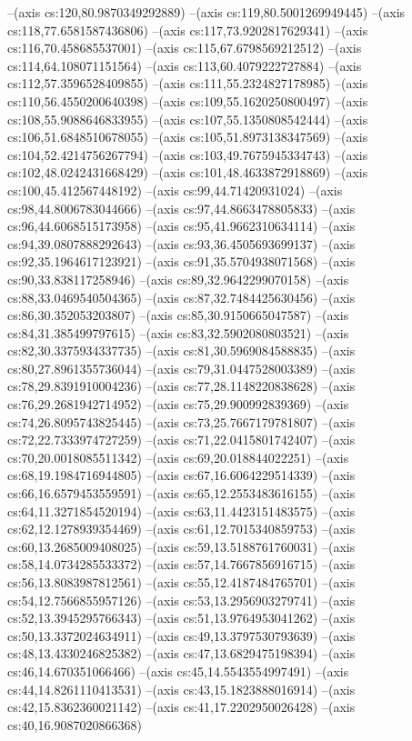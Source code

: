 --(axis cs:120,80.9870349292889)
--(axis cs:119,80.5001269949445)
--(axis cs:118,77.6581587436806)
--(axis cs:117,73.9202817629341)
--(axis cs:116,70.458685537001)
--(axis cs:115,67.6798569212512)
--(axis cs:114,64.108071151564)
--(axis cs:113,60.4079222727884)
--(axis cs:112,57.3596528409855)
--(axis cs:111,55.2324827178985)
--(axis cs:110,56.4550200640398)
--(axis cs:109,55.1620250800497)
--(axis cs:108,55.9088646833955)
--(axis cs:107,55.1350808542444)
--(axis cs:106,51.6848510678055)
--(axis cs:105,51.8973138347569)
--(axis cs:104,52.4214756267794)
--(axis cs:103,49.7675945334743)
--(axis cs:102,48.0242431668429)
--(axis cs:101,48.4633872918869)
--(axis cs:100,45.412567448192)
--(axis cs:99,44.71420931024)
--(axis cs:98,44.8006783044666)
--(axis cs:97,44.8663478805833)
--(axis cs:96,44.6068515173958)
--(axis cs:95,41.9662310634114)
--(axis cs:94,39.0807888292643)
--(axis cs:93,36.4505693699137)
--(axis cs:92,35.1964617123921)
--(axis cs:91,35.5704938071568)
--(axis cs:90,33.838117258946)
--(axis cs:89,32.9642299070158)
--(axis cs:88,33.0469540504365)
--(axis cs:87,32.7484425630456)
--(axis cs:86,30.352053203807)
--(axis cs:85,30.9150665047587)
--(axis cs:84,31.385499797615)
--(axis cs:83,32.5902080803521)
--(axis cs:82,30.3375934337735)
--(axis cs:81,30.5969084588835)
--(axis cs:80,27.8961355736044)
--(axis cs:79,31.0447528003389)
--(axis cs:78,29.8391910004236)
--(axis cs:77,28.1148220838628)
--(axis cs:76,29.2681942714952)
--(axis cs:75,29.900992839369)
--(axis cs:74,26.8095743825445)
--(axis cs:73,25.7667179781807)
--(axis cs:72,22.7333974727259)
--(axis cs:71,22.0415801742407)
--(axis cs:70,20.0018085511342)
--(axis cs:69,20.018844022251)
--(axis cs:68,19.1984716944805)
--(axis cs:67,16.6064229514339)
--(axis cs:66,16.6579453559591)
--(axis cs:65,12.2553483616155)
--(axis cs:64,11.3271854520194)
--(axis cs:63,11.4423151483575)
--(axis cs:62,12.1278939354469)
--(axis cs:61,12.7015340859753)
--(axis cs:60,13.2685009408025)
--(axis cs:59,13.5188761760031)
--(axis cs:58,14.0734285533372)
--(axis cs:57,14.7667856916715)
--(axis cs:56,13.8083987812561)
--(axis cs:55,12.4187484765701)
--(axis cs:54,12.7566855957126)
--(axis cs:53,13.2956903279741)
--(axis cs:52,13.3945295766343)
--(axis cs:51,13.9764953041262)
--(axis cs:50,13.3372024634911)
--(axis cs:49,13.3797530793639)
--(axis cs:48,13.4330246825382)
--(axis cs:47,13.6829475198394)
--(axis cs:46,14.670351066466)
--(axis cs:45,14.5543554997491)
--(axis cs:44,14.8261110413531)
--(axis cs:43,15.1823888016914)
--(axis cs:42,15.8362360021142)
--(axis cs:41,17.2202950026428)
--(axis cs:40,16.9087020866368)
